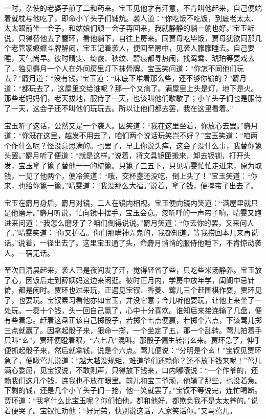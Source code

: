 \documentclass[12pt,oneside]{book}
\begin{document}
一时，杂使的老婆子煎了二和药来。宝玉见他才有汗意，不肯叫他起来，自己便端着就枕与他吃了，即命小丫头子们铺炕。袭人道：“你吃饭不吃饭，到底老太太、太太跟前坐一会子，和姑娘们顽一会子再回来，我就静静的躺一躺也好。”宝玉听说，只得替他去了簪环，看他躺下，自往上房来。同贾母吃毕饭，贾母犹欲同那几个老管家嬷嬷斗牌解闷，宝玉记着袭人，便回至房中，见袭人朦朦睡去。自己要睡，天气尚早。彼时晴雯、绮霰、秋纹、碧痕都寻热闹，找鸳鸯、琥珀等耍戏去了，独见麝月一个人在外间房里灯下抹骨牌。宝玉笑问道：“你怎不同他们玩去？”麝月道：“没有钱。”宝玉道：“床底下堆着那么些，还不够你输的？”麝月道：“都玩去了，这屋里交给谁呢？那一个又病了。满屋里上头是灯，地下是火。那些老妈妈们，老天拔地，服侍了一天，也该叫他们歇歇了；小丫头子们也是服侍了一天，这会子还不叫他们玩玩去。所以让他们都去罢，我在这里看着。”

宝玉听了这话，公然又是一个袭人。因笑道：“我在这里坐着，你放心去罢。”麝月道：“你既在这里，越发不用去了，咱们两个说话玩笑岂不好？”宝玉笑道：“咱两个作什么呢？怪没意思满的。也罢了，早上你说头痒，这会子没什么事，我替你篦头罢。”麝月听了便道：“就是这样。”说着，将文具镜匣搬来，卸去钗钏，打开头发，宝玉拿了篦子替他一一的梳篦。只篦了三五下，只见晴雯忙忙走进来，原为取钱，一见了他两个，便冷笑道：“哦，交杯盏还没吃，倒上头了！”宝玉笑道：“你来，也给你篦一篦。”晴雯道：“我没那么大福。”说着，拿了钱，便摔帘子出去了。

宝玉在麝月身后，麝月对镜，二人在镜内相视。宝玉便向镜内笑道：“满屋里就只是他磨牙。”麝月听说，忙向镜中摆手，宝玉会意。忽听呼的一声帘子响，晴雯又跑进来问道：“我怎么磨牙了？咱们倒得说说。”麝月笑道：“你去你的罢，又来问人了。”晴雯笑道：“你又护着。你们那瞒神弄鬼的，我都知道。等我捞回本儿来再说话。”说着，一径出去了。这里宝玉通了头，命麝月悄悄的服侍他睡下，不肯惊动袭人。一宿无话。

至次日清晨起来，袭人已是夜间发了汗，觉得轻省了些，只吃些米汤静养。宝玉放了心，因饭后走到薛姨妈这边来闲逛。彼时正月内，学房中放年学，闺阁中忌针黹，都是闲时。贾环也过来玩，正遇见宝钗、香菱、莺儿三个赶围棋作耍，贾环见了，也要玩。宝钗素习看他亦如宝玉，并没它意；今儿听他要玩，让他上来坐了一处玩。一磊十个钱，头一回自己赢了，心中十分喜欢。谁知后来接连输了几盘，便有些着急。赶着这盘正该自己掷骰子，若掷个七点便赢，若掷个六点，下该莺儿掷三点就赢了。因拿起骰子来，狠命一掷，一个坐定了五，那一个乱转。莺儿拍着手只叫“ㄠ”，贾环便瞪着眼，“六七八”混叫。那骰子偏生转出ㄠ来。贾环急了，伸手便抓起骰子来，然后就拿钱，说是个六点。莺儿便说：“分明是个ㄠ！”宝钗见贾环急了，便瞅莺儿说道：“越大越没规矩，难道爷们还赖你？还不放下钱来呢！”莺儿满心委屈，见宝钗说，不敢则声，只得放下钱来，口内嘟囔说：“一个作爷的，还赖我们这几个钱，连我也不放在眼里。前儿和宝二爷顽，他输了那些，也没着急。下剩的钱，还是几个小丫头子们一抢，他一笑就罢了。”宝钗不等说完，连忙喝断。贾环道：“我拿什么比宝玉呢？你们怕他，都和他好，都欺负我不是太太养的。”说着便哭了。宝钗忙劝他：“好兄弟，快别说这话，人家笑话你。”又骂莺儿。
\end{document}
